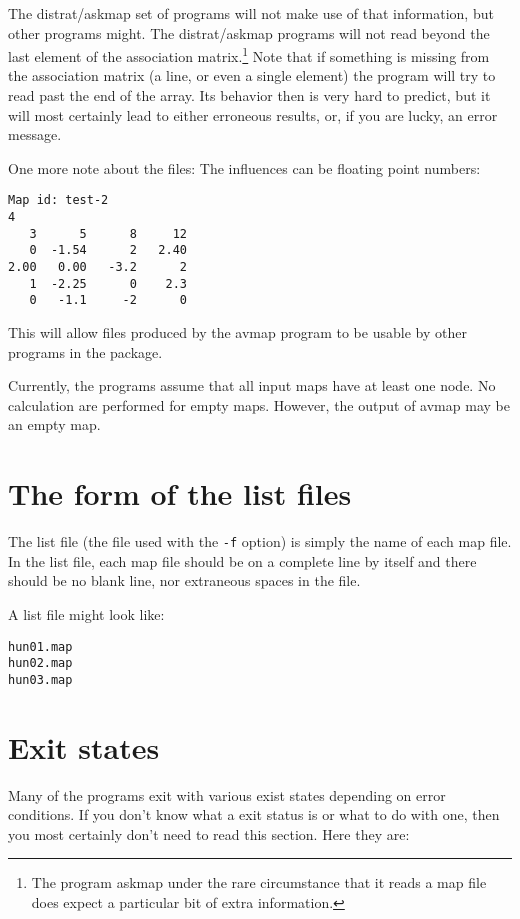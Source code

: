 \documentclass[%
	11pt,
        a4paper,
        twoside]{workrep}
\newcommand*{\prg}[1]{\textsf{#1}}		%
\newcommand{\dram}{\prg{distrat}/\prg{askmap}\xspace}	%
\begin{document}
The \dram set of programs will not make use of that information, but other
programs might.  The \dram programs will not read beyond the last
element of the association matrix.\footnote{%
  The program \prg{askmap} under the rare circumstance that it
  reads a map file does expect a particular bit of extra information.}
Note that if something is
missing from the association matrix (a line, or even a single
element) the program will try to read past the end of the array.
Its behavior then is very hard to predict, but it will most certainly
lead to either erroneous results, or, if you are lucky, an error message.

One more note about the files:  The influences can be floating point
numbers:

\begin{verbatim}
Map id: test-2
4
   3      5      8     12
   0  -1.54      2   2.40
2.00   0.00   -3.2      2
   1  -2.25      0    2.3
   0   -1.1     -2      0
\end{verbatim}

This will allow files produced by the \prg{avmap} program to be usable
by other programs in the package.

Currently, the programs assume that all input maps have at least one
node.  No calculation are performed for empty maps.  However, the
output of \prg{avmap} may be an empty map.

\section{The form of the list files}\label{sec:listfile}

The list file (the file used with the \texttt{-f} option) is simply the name
of each map file.  In the list file, each map file should be on a
complete line by itself and there should be no blank line, nor
extraneous spaces in the file.

A list file might look like:

\begin{verbatim}
hun01.map
hun02.map
hun03.map
\end{verbatim}

\section{Exit states}\label{sec:exitstates}

Many of the programs exit with various exist states depending on
error conditions.  If you don't know what a exit status is or
what to do with one, then you most certainly don't need to
read this section.  Here they are:
\end{document}

